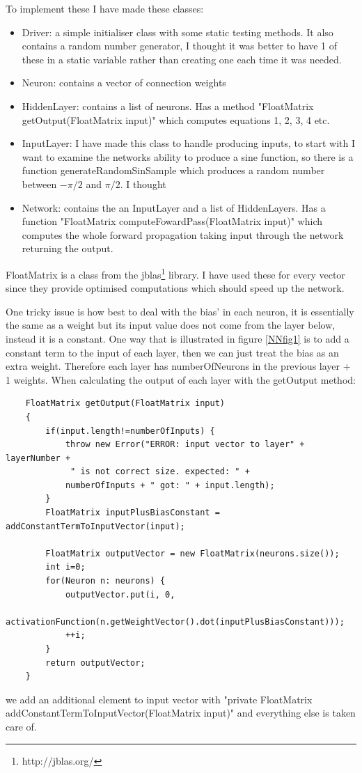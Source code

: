 \documentclass[11pt]{article} %
\begin{document}
To implement these I have made these classes:
\begin{itemize}
\item{Driver: a simple initialiser class with some static testing methods. It also contains a random number generator, I thought it was better to have 1 of these in a static variable rather than creating one each time it was needed. }
\item{Neuron: contains a vector of connection weights}
\item{HiddenLayer:  contains a list of neurons. Has a method "FloatMatrix getOutput(FloatMatrix input)" which computes equations 1, 2, 3, 4 etc.}
\item{InputLayer:  I have made this class to handle producing inputs, to start with I want to examine the networks ability to produce a sine function, so there is a function generateRandomSinSample which produces a random number between $-\pi/2$ and $\pi/2$. I thought }
\item{Network: contains the an InputLayer and a list of HiddenLayers. Has a function "FloatMatrix computeFowardPass(FloatMatrix input)" which computes the whole forward propagation taking input through the network returning the output.}
\end{itemize}
 
FloatMatrix is a class from the jblas\footnote{http://jblas.org/} library. I have used these for every vector since they provide optimised computations which should speed up the network. 

One tricky issue is how best to deal with the bias' in each neuron, it is essentially the same as a weight but its input value does not come from the layer below, instead it is a constant. One way that is illustrated in figure \ref{NNfig1} is to add a constant term to the input of each layer, then we can just treat the bias as an extra weight. Therefore each layer has numberOfNeurons in the previous layer + 1 weights. When calculating the output of each layer with the getOutput method:
\begin{lstlisting}
    FloatMatrix getOutput(FloatMatrix input)
    {
        if(input.length!=numberOfInputs) {
            throw new Error("ERROR: input vector to layer" + layerNumber +
             " is not correct size. expected: " +
            numberOfInputs + " got: " + input.length);
        }
        FloatMatrix inputPlusBiasConstant = addConstantTermToInputVector(input);
        
        FloatMatrix outputVector = new FloatMatrix(neurons.size());
        int i=0;
        for(Neuron n: neurons) {
            outputVector.put(i, 0,
            activationFunction(n.getWeightVector().dot(inputPlusBiasConstant)));
            ++i;
        }
        return outputVector;
    }
\end{lstlisting}
we add an additional element to input vector with     "private FloatMatrix addConstantTermToInputVector(FloatMatrix input)" and everything else is taken care of.
\end{document}
